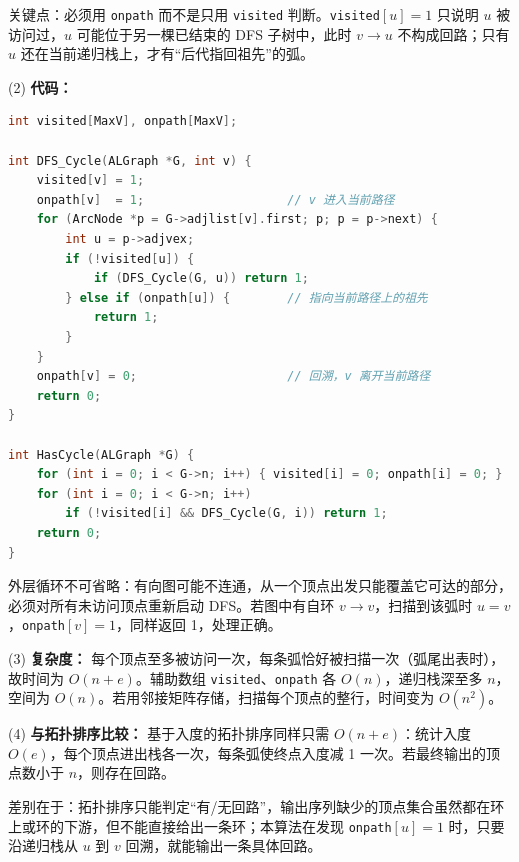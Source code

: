 \begin{enumerate}[resume]
关键点：必须用 \texttt{onpath} 而不是只用 \texttt{visited} 判断。\texttt{visited}$[u]=1$ 只说明 $u$ 被访问过，$u$ 可能位于另一棵已结束的 DFS 子树中，此时 $v\to u$ 不构成回路；只有 $u$ 还在当前递归栈上，才有“后代指回祖先”的弧。

(2) \textbf{代码：}
\begin{lstlisting}[language=C]
int visited[MaxV], onpath[MaxV];

int DFS_Cycle(ALGraph *G, int v) {
    visited[v] = 1;
    onpath[v]  = 1;                    // v 进入当前路径
    for (ArcNode *p = G->adjlist[v].first; p; p = p->next) {
        int u = p->adjvex;
        if (!visited[u]) {
            if (DFS_Cycle(G, u)) return 1;
        } else if (onpath[u]) {        // 指向当前路径上的祖先
            return 1;
        }
    }
    onpath[v] = 0;                     // 回溯，v 离开当前路径
    return 0;
}

int HasCycle(ALGraph *G) {
    for (int i = 0; i < G->n; i++) { visited[i] = 0; onpath[i] = 0; }
    for (int i = 0; i < G->n; i++)
        if (!visited[i] && DFS_Cycle(G, i)) return 1;
    return 0;
}
\end{lstlisting}

外层循环不可省略：有向图可能不连通，从一个顶点出发只能覆盖它可达的部分，必须对所有未访问顶点重新启动 DFS。若图中有自环 $v\to v$，扫描到该弧时 $u=v$，\texttt{onpath}$[v]=1$，同样返回 1，处理正确。

(3) \textbf{复杂度：} 每个顶点至多被访问一次，每条弧恰好被扫描一次（弧尾出表时），故时间为 $O(n+e)$。辅助数组 \texttt{visited}、\texttt{onpath} 各 $O(n)$，递归栈深至多 $n$，空间为 $O(n)$。若用邻接矩阵存储，扫描每个顶点的整行，时间变为 $O(n^2)$。

(4) \textbf{与拓扑排序比较：} 基于入度的拓扑排序同样只需 $O(n+e)$：统计入度 $O(e)$，每个顶点进出栈各一次，每条弧使终点入度减 1 一次。若最终输出的顶点数小于 $n$，则存在回路。

差别在于：拓扑排序只能判定“有/无回路”，输出序列缺少的顶点集合虽然都在环上或环的下游，但不能直接给出一条环；本算法在发现 \texttt{onpath}$[u]=1$ 时，只要沿递归栈从 $u$ 到 $v$ 回溯，就能输出一条具体回路。

\else \answerarea[14] \fi


\end{enumerate}
